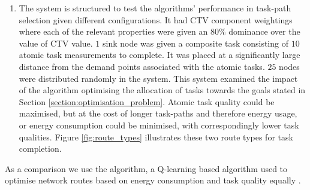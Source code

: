 \begin{enumerate}
	\item The \simulationExtended{}{} system is structured to test the algorithms' performance in task-path selection given different configurations. 
	It had CTV component weightings where each of the relevant properties were given an $80\%$ dominance over the value of CTV value. $1$ sink node was given a composite task consisting of $10$ atomic task measurements to complete. It was placed at a significantly large distance from the demand points associated with the atomic tasks. $25$ nodes were distributed randomly in the system. This system examined the impact of the algorithm optimising the allocation of tasks towards the goals stated in Section \ref{section:optimisation_problem}. Atomic task quality could be maximised, but at the cost of longer task-paths and therefore energy usage, or energy consumption could be minimised, with correspondingly lower task qualities. Figure \ref{fig:route_types} illustrates these two route types for task completion.
\end{enumerate}
  As a comparison we use the \acronymQRouting{}{} algorithm, a Q-learning based algorithm  used to optimise network routes based on energy consumption and task quality equally \citep{XXX, XXX}.